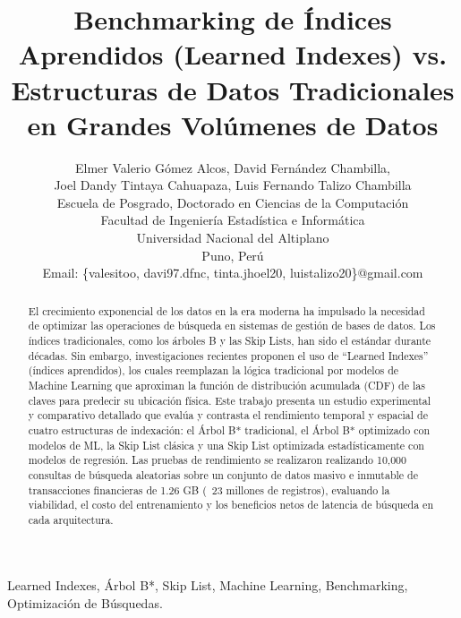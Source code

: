\documentclass[twocolumn,10pt,journal]{IEEEtran}
\begin{document}
\title{Benchmarking de \'Indices Aprendidos (Learned Indexes) vs. Estructuras de Datos Tradicionales en Grandes Vol\'umenes de Datos}

\author{
    Elmer Valerio G\'omez Alcos, David Fern\'andez Chambilla,\\
    Joel Dandy Tintaya Cahuapaza, Luis Fernando Talizo Chambilla\\
    \small{Escuela de Posgrado, Doctorado en Ciencias de la Computaci\'on}\\
    \small{Facultad de Ingenier\'ia Estad\'istica e Inform\'atica}\\
    \small{Universidad Nacional del Altiplano}\\
    \small{Puno, Per\'u}\\
    \small{Email: \{valesitoo, davi97.dfnc, tinta.jhoel20, luistalizo20\}@gmail.com}
}

\maketitle

\begin{abstract}
El crecimiento exponencial de los datos en la era moderna ha impulsado la necesidad de optimizar las operaciones de búsqueda en sistemas de gestión de bases de datos. Los índices tradicionales, como los árboles B y las Skip Lists, han sido el estándar durante décadas. Sin embargo, investigaciones recientes proponen el uso de ``Learned Indexes'' (índices aprendidos), los cuales reemplazan la lógica tradicional por modelos de Machine Learning que aproximan la función de distribución acumulada (CDF) de las claves para predecir su ubicación física. Este trabajo presenta un estudio experimental y comparativo detallado que evalúa y contrasta el rendimiento temporal y espacial de cuatro estructuras de indexación: el Árbol B* tradicional, el Árbol B* optimizado con modelos de ML, la Skip List clásica y una Skip List optimizada estadísticamente con modelos de regresión. Las pruebas de rendimiento se realizaron realizando 10,000 consultas de búsqueda aleatorias sobre un conjunto de datos masivo e inmutable de transacciones financieras de 1.26 GB (~23 millones de registros), evaluando la viabilidad, el costo del entrenamiento y los beneficios netos de latencia de búsqueda en cada arquitectura.
\end{abstract}

\begin{IEEEkeywords}
Learned Indexes, \'Arbol B*, Skip List, Machine Learning, Benchmarking, Optimizaci\'on de B\'usquedas.
\end{IEEEkeywords}
\end{document}
